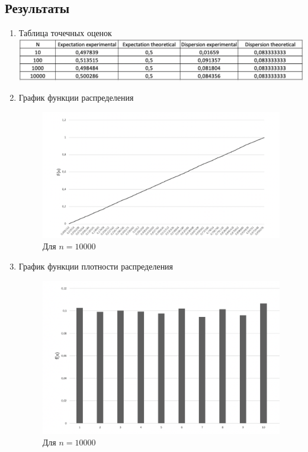 \documentclass{article}
\begin{document}
	\subsection{Результаты}
		\begin{enumerate}
			\item Таблица точечных оценок\\
				\includegraphics[scale=0.5]{table.png}
			
			\item График функции распределения\\
				\begin{figure}[!htb]
					\includegraphics[scale=0.5]{6.png}
					\caption{Для $n = 10000$}
				\end{figure}

			\item График функции плотности распределения\\
				\begin{figure}[!htb]
					\includegraphics[scale=0.6]{5.png}
					\caption{Для $n = 10000$}
				\end{figure}
				

\end{enumerate}
\end{document}
